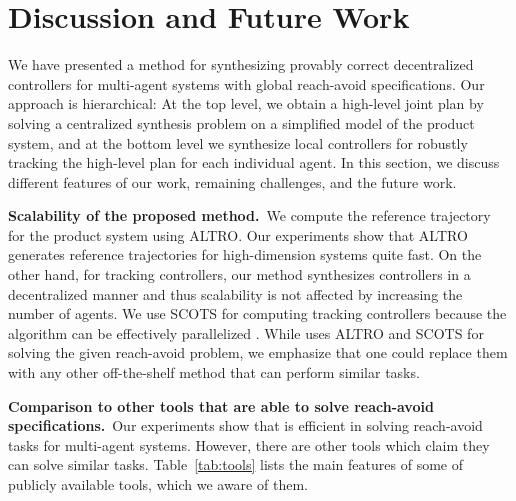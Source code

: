 \section{Discussion and Future Work}
We have presented a method for synthesizing provably correct decentralized controllers for multi-agent systems with global reach-avoid specifications. 
Our approach is hierarchical: At the top level, we obtain a high-level joint plan by solving a centralized synthesis problem on a simplified model of the product system, and at the bottom level we synthesize local controllers for robustly tracking the high-level plan for each individual agent.
In this section, we discuss different features of our work, remaining challenges, and the future work.

\smallskip
\noindent\textbf{Scalability of the proposed method.}\
We compute the reference trajectory for the product system using ALTRO. Our experiments show that ALTRO generates reference trajectories for high-dimension systems quite fast. On the other hand, for tracking controllers, our method synthesizes controllers in a decentralized manner and thus scalability is not affected by increasing the number of agents. We use SCOTS for computing tracking controllers because the algorithm can be effectively parallelized \cite{KhaledZ19pfaces}. While \tool uses ALTRO and SCOTS for solving the given reach-avoid problem, we emphasize that one could replace them with any other off-the-shelf method that can perform similar tasks.

\smallskip
\noindent\textbf{Comparison to other tools that are able to solve reach-avoid specifications.}\
Our experiments show that \tool is efficient in solving reach-avoid tasks for multi-agent systems. However, there are other tools which claim they can solve similar tasks. Table~\ref{tab:tools} lists the main features of some of publicly available tools, which we aware of them.

